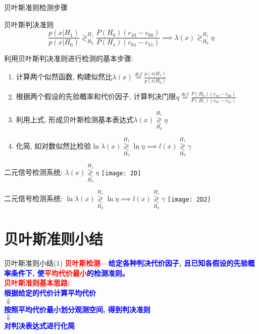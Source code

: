 \begin{frame}{贝叶斯准则检测步骤}
\begin{block}{贝叶斯判决准则}
	\[ \frac{p(x|H_1)}{p(x|H_0)}\mathop{\gtrless}_{H_0}^{H_1}\frac{P(H_0)(c_{10}-c_{00})}{P(H_1)(c_{01}-c_{11})} \implies \lambda(x)\mathop{\gtrless}_{H_0}^{H_1}\eta \]
\end{block}
利用贝叶斯判决准则进行检测的基本步骤:
\begin{enumerate}
	\item 计算两个似然函数, 构建似然比$\lambda(x)\mathop{=}\limits^{def}\frac{p(x|H_1)}{p(x|H_0)}$
	\item 根据两个假设的先验概率和代价因子, 计算判决门限$\eta\mathop{=}\limits^{def}\frac{P(H_0)(c_{10}-c_{00})}{P(H_1)(c_{01}-c_{11})}$
	\item 利用上式, 形成贝叶斯检测基本表达式$\lambda(x)\mathop{\gtrless}\limits_{H_0}^{H_1}\eta$
	\item 化简, 如对数似然比检验$\ln\lambda(x)\mathop{\gtrless}\limits_{H_0}^{H_1}\ln\eta\implies l(x)\mathop{\gtrless}\limits_{H_0}^{H_1}\gamma$
\end{enumerate}
\end{frame}

\begin{frame}{二元信号检测系统: $\lambda(x)\mathop{\gtrless}\limits_{H_0}^{H_1}\eta$}
\centering
\texttt{[image: 2D]}
\end{frame}

\begin{frame}{二元信号检测系统: $\ln\lambda(x)\mathop{\gtrless}\limits_{H_0}^{H_1}\ln\eta\implies l(x)\mathop{\gtrless}\limits_{H_0}^{H_1}\gamma$}
\centering
\texttt{[image: 2D2]}
\end{frame}

\section{贝叶斯准则小结}

\begin{frame}{贝叶斯准则小结(1)}
\textbf{\textcolor{red}{贝叶斯检测---}\textcolor{blue}{给定各种判决代价因子, 且已知各假设的先验概率条件下, 使\textcolor{red}{平均代价最小}的检测准则。}}\\

\bigskip
\textbf{\textcolor{red}{贝叶斯准则基本思路:}}\\
\centering
\textcolor{blue}{\textbf{根据给定的代价计算平均代价}}\\
$\Downarrow$\\
\textcolor{blue}{\textbf{按照平均代价最小划分观测空间, 得到判决准则}}\\
$\Downarrow$\\
\textcolor{blue}{\textbf{对判决表达式进行化简}}
\end{frame}

